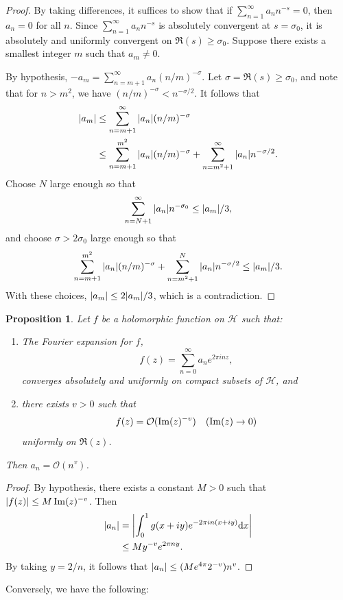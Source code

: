 \documentclass[10pt,leqno,twoside]{article}
\theoremstyle{plain}
\newtheorem{proposition}[lem]{Proposition}
\theoremstyle{definition}
\numberwithin{equation}{section}
\numberwithin{lem}{section}
\begin{document}
\begin{proof}
    By taking differences, it suffices to show that if $\sum_{n=1}^\infty a_nn^{-s} = 0$, then $a_n = 0$ for all $n$. Since $\sum_{n=1}^\infty a_nn^{-s}$ is absolutely convergent at $s = \sigma_0$, it is absolutely and uniformly convergent on $\Re(s)\geq \sigma_0$. Suppose there exists a smallest integer $m$ such that $a_m \neq 0$.
    
    By hypothesis, $-a_m = \sum_{n=m+1}^\infty a_n (n/m)^{-\sigma}$. Let $\sigma = \Re(s)\geq \sigma_0$, and note that for $n>m^2$, we have $(n/m)^{-\sigma}<n^{-\sigma/2}$. It follows that
    \begin{align*}
        \abs{a_m} &\leq \sum_{n=m+1}^\infty \abs{a_n} (n/m)^{-\sigma}\\
        &\leq \sum_{n=m+1}^{m^2} \abs{a_n} (n/m)^{-\sigma} + \sum_{n=m^2+1}^\infty \abs{a_n} n^{-\sigma/2}.
    \end{align*}
    Choose $N$ large enough so that
    \[\sum_{n=N+1}^\infty \abs{a_n}n^{-\sigma_0}\leq \abs{a_m}/3,\]
    and choose $\sigma>2\sigma_0$ large enough so that 
    \[\sum_{n=m+1}^{m^2} \abs{a_n} (n/m)^{-\sigma} + \sum_{n=m^2+1}^N \abs{a_n}n^{-\sigma/2}\leq \abs{a_m}/3.\] With these choices, $\abs{a_m}\leq 2\abs{a_m}/3$, which is a contradiction.
\end{proof}
\begin{proposition}\label{prop: miyake prop pre-lemma 4.3.3}
    Let $f$ be a holomorphic function on $\mathcal H$ such that: 
    \begin{enumerate}[label = \textup{(\arabic*)}]
        \item The Fourier expansion for $f$, \[f(z) = \sum_{n=0}^\infty a_ne^{2\pi i nz},\] converges absolutely and uniformly on compact subsets of $\mathcal H$, and
        \item there exists $v>0$ such that \[f(z) = \mathcal O(\Im(z)^{-v}) \quad \textup{($\Im(z)\to 0$)}\] uniformly on $\Re(z)$. 
    \end{enumerate}
    Then $a_n = \mathcal O(n^v)$.
\end{proposition}
\begin{proof}
    By hypothesis, there exists a constant $M>0$ such that $\abs{f(z)}\leq M\Im(z)^{-v}$. Then \begin{align*}
        \abs{a_n} &= \abs{\int_0^1 g(x+iy)e^{-2\pi i n (x+iy)}\dd x}\\
        &\leq My^{-v}e^{2\pi n y}.
    \end{align*} By taking $y = 2/n$, it follows that $\abs{a_n} \leq (Me^{4\pi}2^{-v})n^v$.
\end{proof} Conversely, we have the following:
\end{document}
